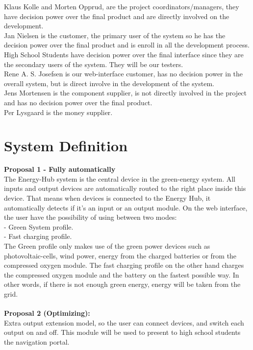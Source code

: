 Klaus Kolle and Morten Opprud, are the project coordinators/managers, they
have decision power over the final product and are directly involved on the
development.\\
\newline
Jan Nielsen is the customer, the primary user of the system so he has the
decision power over the final product and is enroll in all the development
process.\\
\newline
High School Students have decision power over the final interface since they
are the secondary users of the system. They will be our testers.\\
\newline
Rene A. S. Josefsen is our web-interface customer, has no decision power in the
overall system, but is direct involve in the development of the system.\\
\newline
Jens Mortensen is the component supplier, is not directly involved in the
project and has no decision power over the final product.\\
\newline
Per Lysgaard is the money supplier.\\
\newline

\section{System Definition}
\textbf{Proposal 1 - Fully automatically}\\
The Energy-Hub system is the central device in the green-energy system. All
inputs and output devices are automatically routed to the right place inside this
device. That means when devices is connected to the Energy Hub, it automatically
detects if it's an input or an output module. On the web interface, the user
have the possibility of using between two modes:
\\ - Green System profile.
\\ - Fast charging profile.
\\The Green profile only makes use of the green power devices such as
photovoltaic-cells, wind power, energy from the charged batteries or from the
compressed oxygen module. 
The fast charging profile on the other hand charges the compressed oxygen module and the
battery on the fastest possible way. In other words, if there is not enough
green energy, energy will be taken from the grid.
\\\\
\textbf{Proposal 2 (Optimizing):}\\
Extra output extension model, so the user can connect devices, and switch
each output on and off. This module will be used to present to high school
students the navigation portal.